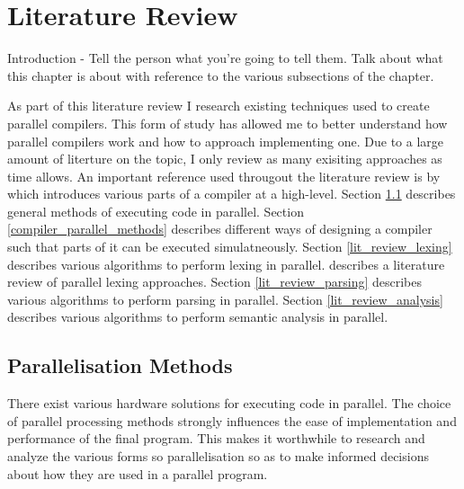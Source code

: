 \chapter{Literature Review} \label{litreview}
\begin{sectionplan}
Introduction - Tell the person what you're going to tell them. Talk about what
this chapter is about with reference to the various subsections of the chapter.
\end{sectionplan}

As part of this literature review I research existing techniques used to create
parallel compilers. This form of study has allowed me to better understand how
parallel compilers work and how to approach implementing one. Due to a large
amount of literture on the topic, I only review as many exisiting approaches
as time allows. An important reference used througout the literature review is by
\cite{scott_programming_2015}  which introduces various parts of a compiler at
a high-level.
\newline \newline
Section \ref{parallelisation_methods} describes general methods of executing
code in parallel.
\newline \newline
Section \ref{compiler_parallel_methods} describes different ways of designing a compiler
such that parts of it can be executed simulatneously.
\newline \newline
Section \ref{lit_review_lexing} describes various algorithms to perform lexing
in parallel.\cite{pai_t_systematic_2020} describes a literature review of parallel lexing
approaches.
\newline \newline
Section \ref{lit_review_parsing} describes various algorithms to perform parsing
in parallel.
\newline \newline
Section \ref{lit_review_analysis} describes various algorithms to perform semantic
analysis in parallel.
\newline \newline

\section{Parallelisation Methods} \label{parallelisation_methods}
There exist various hardware solutions for executing code in parallel.
The choice of parallel processing methods strongly influences the ease of
implementation and performance of the final program. This makes it worthwhile to
research and analyze the various forms so parallelisation so as to make informed
decisions about how they are used in a parallel program.

